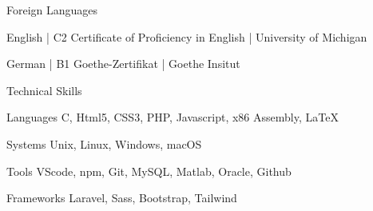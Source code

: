 



\begin{cvpersonals}
    \cvsubsection
    {Foreign Languages} %
\end{cvpersonals}

\begin{cvskills}
    \cvskill
    {English |} %
    {C2 Certificate of Proficiency in English | University of Michigan}%



    \cvskill
    {German |} %
    {B1 Goethe-Zertifikat | Goethe Insitut } %

\end{cvskills}

\begin{cvpersonals}
    \cvsubsection
    {Technical Skills} %
\end{cvpersonals}



\begin{cvskills}


    \cvskill
    {Languages} %
    {C, Html5, CSS3, PHP, Javascript, x86 Assembly, LaTeX} %

    \cvskill
    {Systems} %
    {Unix, Linux, Windows, macOS} %



    \cvskill
    {Tools} %
    {VScode, npm, Git, MySQL, Matlab, Oracle, Github} %


    \cvskill
    {Frameworks} %
    {Laravel, Sass, Bootstrap, Tailwind} %
\end{cvskills}